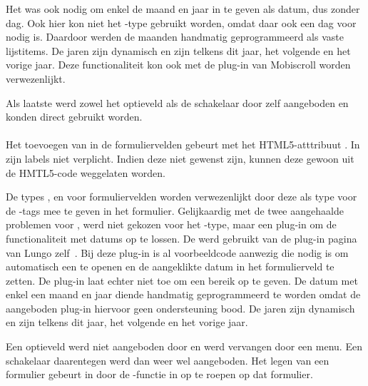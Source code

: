 Het was ook nodig om enkel de maand en jaar in te geven als datum, dus zonder dag.
Ook hier kon niet het -type gebruikt worden, omdat daar ook een dag voor nodig is. 
Daardoor werden de maanden handmatig geprogrammeerd als vaste lijstitems. 
De jaren zijn dynamisch en zijn telkens dit jaar, het volgende en het vorige jaar. 
Deze functionaliteit kon ook met de plug-in van Mobiscroll worden verwezenlijkt.

Als laatste werd zowel het optieveld als de schakelaar door \jqm{} zelf aangeboden en konden direct gebruikt worden. 
 
\paragraph{\lungo} 
Het toevoegen van  in de formuliervelden gebeurt met het HTML5-atttribuut .
In \lungo{} zijn labels niet verplicht.
Indien deze niet gewenst zijn, kunnen deze gewoon uit de HMTL5-code weggelaten worden.

De types ,  en  voor formuliervelden worden verwezenlijkt door deze als type voor de -tags mee te geven in het formulier.
Gelijkaardig met de twee aangehaalde problemen voor \jqm{}, werd niet gekozen voor het -type, maar een plug-in om de functionaliteit met datums op te lossen.
De  werd gebruikt van de plug-in pagina van Lungo zelf~\cite{TapQuo2013b}.
Bij deze plug-in is al voorbeeldcode aanwezig die nodig is om automatisch een  te openen en de aangeklikte datum in het formulierveld te zetten.
De plug-in laat echter niet toe om een bereik op te geven.
De datum met enkel een maand en jaar diende handmatig geprogrammeerd te worden omdat de aangeboden plug-in hiervoor geen ondersteuning bood.
De jaren zijn dynamisch en zijn telkens dit jaar, het volgende en het vorige jaar. 

Een optieveld werd niet aangeboden door \lungo{} en werd vervangen door een menu. 
Een schakelaar daarentegen werd dan weer wel aangeboden.
Het legen van een formulier gebeurt in \lungo{} door de -functie in \js{} op te roepen op dat formulier.


\subsection{}
\label{sec:evaluatie-gebruik-vullen-app}

